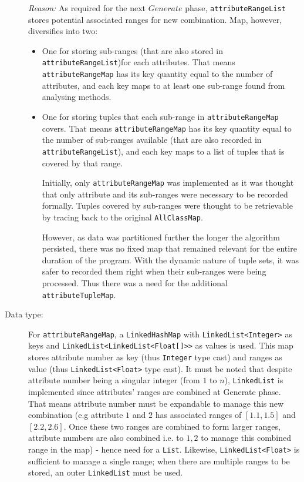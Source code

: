 \begin{description}
\textit{Reason: } As required for the next $Generate$ phase, \texttt{attributeRangeList} stores potential associated ranges for new combination. 
Map, however, diversifies into two: 
\begin{itemize}
	\item One for storing sub-ranges (that are also stored in \texttt{attributeRangeList})for each attributes. That means \texttt{attributeRangeMap} has its key quantity equal to the number of attributes, and each key maps to at least one sub-range found from analysing methods.
	
	\item One for storing tuples that each sub-range in \texttt{attributeRangeMap} covers. That means \texttt{attributeRangeMap} has its key quantity equal to the number of sub-ranges available (that are also recorded in \texttt{attributeRangeList}), and each key maps to a list of tuples that is covered by that range.
	
Initially, only \texttt{attributeRangeMap} was implemented as it was thought that only attribute and its sub-ranges were necessary to be recorded formally. Tuples covered by sub-ranges were thought to be retrievable by tracing back to the original \texttt{AllClassMap}.
	
However, as data was partitioned further the longer the algorithm persisted, there was no fixed map that remained relevant for the entire duration of the program. With the dynamic nature of tuple sets, it was safer to recorded them right when their sub-ranges were being processed. Thus there was a need for the additional \texttt{attributeTupleMap}.
\end{itemize}

\item[Data type: ] For \texttt{attributeRangeMap}, a \texttt{LinkedHashMap} with \texttt{LinkedList<Integer>} as keys and \texttt{LinkedList<LinkedList<Float[]>>} as values is used. This map stores attribute number as key (thus \texttt{Integer} type cast) and ranges as value (thus \texttt{LinkedList<Float>} type cast). It must be noted that despite attribute number being a singular integer (from $1$ to $n$), \texttt{LinkedList} is implemented since attributes' ranges are combined at Generate phase. That means attribute number must be expandable to manage this new combination (e.g attribute $1$ and $2$ has associated ranges of $[1.1,1.5]$ and $[2.2, 2.6]$. Once these two ranges are combined to form larger ranges, attribute numbers are also combined i.e. to ${1,2}$ to manage this combined range in the map) - hence need for a \texttt{List}. Likewise, \texttt{LinkedList<Float>} is sufficient to manage a single range; when there are multiple ranges to be stored, an outer \texttt{LinkedList} must be used.


\end{description}
